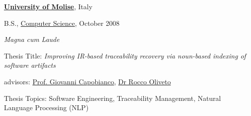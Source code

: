 \documentclass[10pt]{article}
\newcommand{\blankline}{\quad\pagebreak[3]}
\begin{document}
\href{http://www.unimol.it/}{\textbf{University of Molise}}, Italy
\begin{outerlist}

\item[] B.S.,
        \href{http://www.unimol.it/pls/unimolise/v3_s2ew_consultazione.mostra_pagina?id_pagina=51098}
             {Computer Science}, October 2008
        \begin{innerlist}
        \item \emph{Magna cum Laude}
        \item Thesis Title: \emph{Improving IR-based traceability recovery via noun-based indexing of software artifacts}
        \item advisors:
              \href{http://docenti.unimol.it/index.php?u=giovanni.capobianco}
                   {Prof. Giovanni Capobianco},
              \href{http://www.distat.unimol.it/people/oliveto/Home.html}
                   {Dr Rocco Oliveto}
        \item Thesis Topics: Software Engineering, Traceability Management, Natural Language Processing (NLP)
        \end{innerlist}

\end{outerlist} 

\blankline
\end{document}
